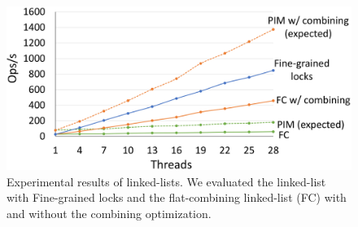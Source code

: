 \begin{figure}[ht!]
    \centering
    \includegraphics[width=1.0\linewidth]{linkedlist_data.eps} %
    \caption{Experimental results of linked-lists. We evaluated the linked-list with Fine-grained locks 
        and the flat-combining linked-list (FC) with and without the combining optimization.}
   \label{figure:linkedlist_data}
\end{figure}


